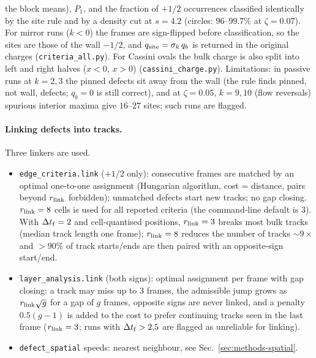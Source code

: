 the block means), $P_1$, and the fraction of $+1/2$ occurrences classified identically by the site rule
and by a density cut at $s=4.2$ (circles: $96$--$99.7\%$ at $\zeta=0.07$).
For mirror runs ($k<0$) the frames are sign-flipped before classification, so the sites are those of the
wall $-1/2$, and $q_{\rm site}=\sigma_k\,q_b$ is returned in the original charges (\texttt{criteria\_all.py}).
For Cassini ovals the bulk charge is also split into left and right halves ($x<0$, $x>0$)
(\texttt{cassini\_charge.py}). Limitations: in passive runs at $k=2,3$ the pinned defects sit away from the
wall (the rule finds pinned, not wall, defects; $q_b=0$ is still correct), and at $\zeta=0.05$, $k=9,10$
(flow reversals) spurious interior maxima give $16$--$27$ sites; such runs are flagged.

\paragraph{Linking defects into tracks.}
Three linkers are used.
\begin{itemize}
  \item \texttt{edge\_criteria.link} ($+1/2$ only): consecutive frames are matched by an optimal
        one-to-one assignment (Hungarian algorithm, cost = distance, pairs beyond $r_{\rm link}$ forbidden);
        unmatched defects start new tracks; no gap closing.
        $r_{\rm link}=8$ cells is used for all reported criteria (the command-line default is $3$).
        With $\Delta t_{\rm f}=2$ and cell-quantised positions, $r_{\rm link}=3$ breaks most bulk tracks
        (median track length one frame); $r_{\rm link}=8$ reduces the number of tracks $\sim9\times$ and
        $>90\%$ of track starts/ends are then paired with an opposite-sign start/end.
  \item \texttt{layer\_analysis.link} (both signs): optimal assignment per frame with gap closing:
        a track may miss up to $3$ frames, the admissible jump grows as $r_{\rm link}\sqrt{g}$ for a gap of $g$
        frames, opposite signs are never linked, and a penalty $0.5(g-1)$ is added to the cost to prefer
        continuing tracks seen in the last frame ($r_{\rm link}=3$; runs with $\Delta t_{\rm f}>2.5$ are flagged as
        unreliable for linking).
  \item \texttt{defect\_spatial} speeds: nearest neighbour, see Sec.~\ref{sec:methods-spatial}.
\end{itemize}

